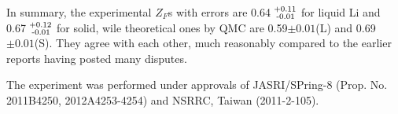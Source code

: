 \documentclass[twocolumn,showpacs,showkeys,fleqn,prl,superscriptaddress]{revtex4}%
\newcommand{\nn}[1]{\textnormal{ #1}}
\begin{document}
In summary,  the experimental $Z_F$s with errors are 0.64$^{\nn{+0.11}}_{\nn{\;-0.01}}$ for liquid Li and 0.67$^{\nn{+0.12}}_{\nn{\;-0.01}}$ for solid, %
wile theoretical ones by QMC are {\color{red}0.59$\pm0.01$(L) and 0.69$\pm0.01$(S)}.
They agree with each other, much reasonably compared to the earlier reports having posted many disputes.      



The experiment was performed under approvals of JASRI/SPring-8 (Prop. No. 2011B4250, 2012A4253-4254) and NSRRC, Taiwan (2011-2-105).
 
       

%
%



\end{document}
